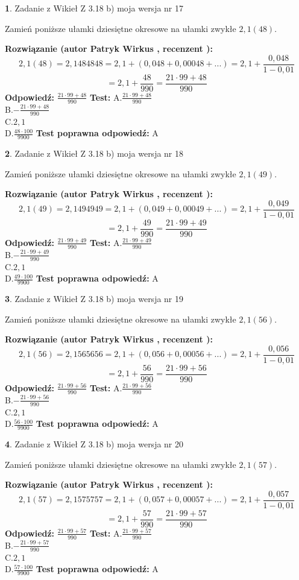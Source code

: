 \documentclass[12pt, a4paper]{article}
\theoremstyle{definition} %
\newtheorem{zad}{}
\newcommand{\zadStart}[1]{\begin{zad}#1\newline}
\newcommand{\zadStop}{\end{zad}}
\newcommand{\rozwStart}[2]{\noindent \textbf{Rozwiązanie (autor #1 , recenzent #2): }\newline}
\newcommand{\rozwStop}{\newline}
\newcommand{\odpStart}{\noindent \textbf{Odpowiedź:}\newline}
\newcommand{\odpStop}{\newline}
\newcommand{\testStart}{\noindent \textbf{Test:}\newline}
\newcommand{\testStop}{\newline}
\newcommand{\kluczStart}{\noindent \textbf{Test poprawna odpowiedź:}\newline}
\newcommand{\kluczStop}{\newline}
\begin{document}
\zadStart{Zadanie z Wikieł Z 3.18 b) moja wersja nr 17}

Zamień poniższe ułamki dziesiętne okresowe na ułamki zwykłe $2,1(48)$.
\zadStop
\rozwStart{Patryk Wirkus}{}
$$2,1(48)=2,1484848=2,1+(0,048+0,00048+...)=2,1+\frac{0,048}{1-0,01}$$
$$=2,1+\frac{48}{990}=\frac{21\cdot99+48}{990}$$
\rozwStop
\odpStart
$\frac{21\cdot99+48}{990}$
\odpStop
\testStart
A.$\frac{21\cdot99+48}{990}$\\ B.$-\frac{21\cdot99+48}{990}$\\ C.$2,1$\\ D.$\frac{48\cdot100}{9900}$
\testStop
\kluczStart
A
\kluczStop



\zadStart{Zadanie z Wikieł Z 3.18 b) moja wersja nr 18}

Zamień poniższe ułamki dziesiętne okresowe na ułamki zwykłe $2,1(49)$.
\zadStop
\rozwStart{Patryk Wirkus}{}
$$2,1(49)=2,1494949=2,1+(0,049+0,00049+...)=2,1+\frac{0,049}{1-0,01}$$
$$=2,1+\frac{49}{990}=\frac{21\cdot99+49}{990}$$
\rozwStop
\odpStart
$\frac{21\cdot99+49}{990}$
\odpStop
\testStart
A.$\frac{21\cdot99+49}{990}$\\ B.$-\frac{21\cdot99+49}{990}$\\ C.$2,1$\\ D.$\frac{49\cdot100}{9900}$
\testStop
\kluczStart
A
\kluczStop



\zadStart{Zadanie z Wikieł Z 3.18 b) moja wersja nr 19}

Zamień poniższe ułamki dziesiętne okresowe na ułamki zwykłe $2,1(56)$.
\zadStop
\rozwStart{Patryk Wirkus}{}
$$2,1(56)=2,1565656=2,1+(0,056+0,00056+...)=2,1+\frac{0,056}{1-0,01}$$
$$=2,1+\frac{56}{990}=\frac{21\cdot99+56}{990}$$
\rozwStop
\odpStart
$\frac{21\cdot99+56}{990}$
\odpStop
\testStart
A.$\frac{21\cdot99+56}{990}$\\ B.$-\frac{21\cdot99+56}{990}$\\ C.$2,1$\\ D.$\frac{56\cdot100}{9900}$
\testStop
\kluczStart
A
\kluczStop



\zadStart{Zadanie z Wikieł Z 3.18 b) moja wersja nr 20}

Zamień poniższe ułamki dziesiętne okresowe na ułamki zwykłe $2,1(57)$.
\zadStop
\rozwStart{Patryk Wirkus}{}
$$2,1(57)=2,1575757=2,1+(0,057+0,00057+...)=2,1+\frac{0,057}{1-0,01}$$
$$=2,1+\frac{57}{990}=\frac{21\cdot99+57}{990}$$
\rozwStop
\odpStart
$\frac{21\cdot99+57}{990}$
\odpStop
\testStart
A.$\frac{21\cdot99+57}{990}$\\ B.$-\frac{21\cdot99+57}{990}$\\ C.$2,1$\\ D.$\frac{57\cdot100}{9900}$
\testStop
\kluczStart
A
\kluczStop
\end{document}
